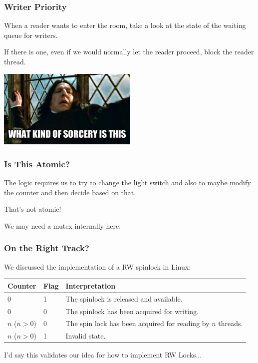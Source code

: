 \begin{frame}
\frametitle{Writer Priority}

When a reader wants to enter the room, take a look at the state of the waiting queue for writers. 

If there is one, even if we would normally let the reader proceed, block the reader thread.

\begin{center}
	\includegraphics[width=0.5\textwidth]{images/sorcery.jpg}
\end{center}

\end{frame}

\begin{frame}
\frametitle{Is This Atomic?}

The logic requires us to try to change the light switch and also to maybe modify the counter and then decide based on that.

That's not atomic!

We may need a mutex internally here.

\end{frame}

\begin{frame}
\frametitle{On the Right Track?}

 We discussed the implementation of a RW spinlock in Linux:

\begin{center}
	\begin{tabular}{l|l|l}
		\textbf{Counter} & \textbf{Flag} & \textbf{Interpretation}                                     \\\hline
		0                & 1             & The spinlock is released and available.                     \\
		0                & 0             & The spinlock has been acquired for writing.                 \\
		$n$ ($n > 0$)    & 0             & The spin lock has been acquired for reading by $n$ threads. \\
		$n$ ($n > 0$)    & 1             & Invalid state.                                              \\
	\end{tabular}
\end{center}

I'd say this validates our idea for how to implement RW Locks...

\end{frame}

